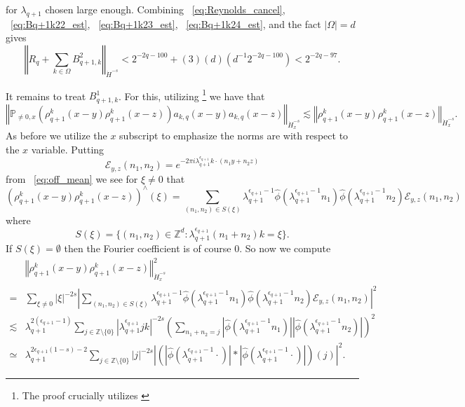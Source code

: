 \documentclass[12pt,reqno,letterpaper]{amsart}
\numberwithin{equation}{section}
\newcommand{\1}{{\bf 1}}
\newcommand{\2}{{\bf 2}}
\newcommand{\Z}{\mathbb Z}
\theoremstyle{remark}
\theoremstyle{remark}
\begin{document}
for $\lambda_{q+1}$ chosen large enough. Combining ~\eqref{eq:Reynolds_cancel}, ~\eqref{eq:Bq+1k22_est}, ~\eqref{eq:Bq+1k23_est}, ~\eqref{eq:Bq+1k24_est}, and the fact $|\Omega| = d$ gives
\begin{equation}\label{eq:Bq+1k2_est}
    \left\Vert R_q + \sum_{k \in \Omega} B_{q+1,k}^2\right\Vert_{\dot{H}^{-s}} < 2^{-2q-100} + (3)(d)\left(d^{-1}2^{-2q-100}\right) < 2^{-2q-97}.
\end{equation}

It remains to treat $B_{q+1,k}^1$. For this, utilizing \cite[Lemma 2.16]{GR}\footnote{The proof crucially utilizes \cite[Proposition 1]{BOZ}} we have that
\begin{equation}\label{eq:kato_ponce_est}
    \left\Vert \mathbb{P}_{\not=0,x}\left(\rho_{q+1}^k(x-y) \rho_{q+1}^k(x-z)\right) a_{k,q}(x-y) a_{k,q}(x-z) \right\Vert_{\dot{H}^{-s}_x} \lesssim \left\Vert \rho_{q+1}^k(x-y) \rho_{q+1}^k(x-z)\right\Vert_{\dot{H}^{-s}_x}.
\end{equation}
As before we utilize the $x$ subscript to emphasize the norms are with respect to the $x$ variable. Putting
$$
\mathcal{E}_{y,z}(n_1,n_2) = e^{-2\pi i \lambda_{q+1}^{\epsilon_{q+1}} k \cdot (n_1y + n_2z)}
$$
from ~\eqref{eq:off_mean} we see for $\xi \not =0$ that
\begin{equation}
    \left(\rho_{q+1}^k(x-y) \rho_{q+1}^k(x-z)\right)^{\wedge}(\xi) = \sum_{(n_1,n_2) \in S(\xi)} \lambda_{q+1}^{\epsilon_{q+1}-1} \hat{\phi}\left(\lambda_{q+1}^{\epsilon_{q+1}-1}n_1\right) \hat{\phi}\left(\lambda_{q+1}^{\epsilon_{q+1}-1}n_2\right) \mathcal{E}_{y,z}(n_1,n_2)
\end{equation}
where
$$
S(\xi) = \{(n_1,n_2) \in \Z^d : \lambda_{q+1}^{\epsilon_{q+1}} (n_1 + n_2)k = \xi\}.
$$
If $S(\xi) = \emptyset$ then the Fourier coefficient is of course $0$. So now we compute
\begin{equation}\label{eq:mean_est_2}
    \begin{split}
        &\left\Vert \rho_{q+1}^k(x-y) \rho_{q+1}^k(x-z)\right\Vert_{\dot{H}^{-s}_x}^2\\
        =& \sum_{\xi \not = 0} |\xi|^{-2s} \left|\sum_{(n_1,n_2) \in S(\xi)} \lambda_{q+1}^{\epsilon_{q+1}-1} \hat{\phi}\left(\lambda_{q+1}^{\epsilon_{q+1}-1}n_1\right) \hat{\phi}\left(\lambda_{q+1}^{\epsilon_{q+1}-1}n_2\right) \mathcal{E}_{y,z}(n_1,n_2)\right|^2\\
        \lesssim& \lambda_{q+1}^{2(\epsilon_{q+1}-1)} \sum_{j \in \Z \setminus \{0\}} |\lambda_{q+1}^{\epsilon_{q+1}} jk|^{-2s} \left(\sum_{n_1+n_2 = j} \left|\hat{\phi}\left(\lambda_{q+1}^{\epsilon_{q+1}-1}n_1\right)\right| \left|\hat{\phi}\left(\lambda_{q+1}^{\epsilon_{q+1}-1}n_2\right)\right|\right)^2\\
        \simeq& \lambda_{q+1}^{2\epsilon_{q+1}(1-s)-2} \sum_{j \in \Z \setminus \{0\}} |j|^{-2s} \left| \left( \left|\hat{\phi}\left(\lambda_{q+1}^{\epsilon_{q+1}-1}\cdot\right)\right| \ast \left|\hat{\phi}\left(\lambda_{q+1}^{\epsilon_{q+1}-1}\cdot\right)\right|\right)(j)\right|^2.
    \end{split}
\end{equation}
\end{document}
